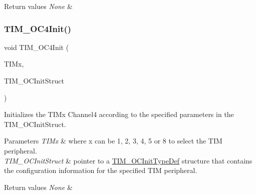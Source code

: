 \begin{DoxyRetVals}{Return values}
{\em None} & \\
\hline
\end{DoxyRetVals}
\mbox{\label{group___t_i_m___private___functions_ga64571ebbb58cac39a9e760050175f11c}} 
\subsubsection{\texorpdfstring{TIM\_OC4Init()}{TIM\_OC4Init()}}
{\footnotesize\ttfamily void T\+I\+M\+\_\+\+O\+C4\+Init (\begin{DoxyParamCaption}\item[{\mbox{\hyperlink{struct_t_i_m___type_def}{T\+I\+M\+\_\+\+Type\+Def}} $\ast$}]{T\+I\+Mx,  }\item[{\mbox{\hyperlink{struct_t_i_m___o_c_init_type_def}{T\+I\+M\+\_\+\+O\+C\+Init\+Type\+Def}} $\ast$}]{T\+I\+M\+\_\+\+O\+C\+Init\+Struct }\end{DoxyParamCaption})}



Initializes the T\+I\+Mx Channel4 according to the specified parameters in the T\+I\+M\+\_\+\+O\+C\+Init\+Struct. 


\begin{DoxyParams}{Parameters}
{\em T\+I\+Mx} & where x can be 1, 2, 3, 4, 5 or 8 to select the T\+IM peripheral. \\
\hline
{\em T\+I\+M\+\_\+\+O\+C\+Init\+Struct} & pointer to a \mbox{\hyperlink{struct_t_i_m___o_c_init_type_def}{T\+I\+M\+\_\+\+O\+C\+Init\+Type\+Def}} structure that contains the configuration information for the specified T\+IM peripheral. \\
\hline
\end{DoxyParams}

\begin{DoxyRetVals}{Return values}
{\em None} & \\
\hline
\end{DoxyRetVals}
\mbox{\label{group___t_i_m___private___functions_gad678410f7c7244f83daad93ce9d1056e}} 
